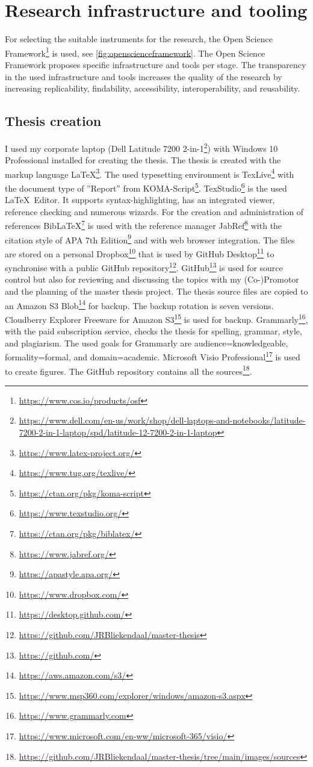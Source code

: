 \section{Research infrastructure and tooling}
\label{sec:researchinfraandtooling}
For selecting the suitable instruments for the research, the Open Science Framework\footnote{\url{https://www.cos.io/products/osf}} is used, see \cref{fig:openscienceframework}. The Open Science Framework proposes specific infrastructure and tools per stage. The transparency in the used infrastructure and tools increases the quality of the research by increasing replicability, findability, accessibility, interoperability, and reusability.

\subsection{Thesis creation}
\label{sub:tbresearchcreation}
I used my corporate laptop (Dell Latitude 7200 2-in-1\footnote{\url{https://www.dell.com/en-us/work/shop/dell-laptops-and-notebooks/latitude-7200-2-in-1-laptop/spd/latitude-12-7200-2-in-1-laptop}}) with Windows 10 Professional installed for creating the thesis. The thesis is created with the markup language \LaTeX\footnote{\url{https://www.latex-project.org/}}. The used typesetting environment is TexLive\footnote{\url{https://www.tug.org/texlive/}} with the document type of ''Report'' from KOMA-Script\footnote{\url{https://ctan.org/pkg/koma-script}}. TexStudio\footnote{\url{https://www.texstudio.org/}} is the used \LaTeX\ Editor. It supports syntax-highlighting, has an integrated viewer, reference checking and numerous wizards. For the creation and administration of references Bib\LaTeX\footnote{\url{https://ctan.org/pkg/biblatex/}} is used with the reference manager JabRef\footnote{\url{https://www.jabref.org/}} with the citation style of APA 7th Edition\footnote{\url{https://apastyle.apa.org/}} and with web browser integration. The files are stored on a personal Dropbox\footnote{\url{https://www.dropbox.com/}} that is used by GitHub Desktop\footnote{\url{https://desktop.github.com/}} to synchronise with a public GitHub repository\footnote{\url{https://github.com/JRBliekendaal/master-thesis}}. GitHub\footnote{\url{https://github.com/}} is used for source control but also for reviewing and discussing the topics with my (Co-)Promotor and the planning of the master thesis project. The thesis source files are copied to an Amazon S3 Blob\footnote{\url{https://aws.amazon.com/s3/}} for backup. The backup rotation is seven versions. Cloudberry Explorer Freeware for Amazon S3\footnote{\url{https://www.msp360.com/explorer/windows/amazon-s3.aspx}} is used for backup. Grammarly\footnote{\url{https://www.grammarly.com}}, with the paid subscription service, checks the thesis for spelling, grammar,  style, and plagiarism. The used goals for Grammarly are audience=knowledgeable, formality=formal, and domain=academic. Microsoft Visio Professional\footnote{\url{https://www.microsoft.com/en-ww/microsoft-365/visio/}} is used to create figures. The GitHub repository contains all the sources\footnote{\url{https://github.com/JRBliekendaal/master-thesis/tree/main/images/sources}}.

